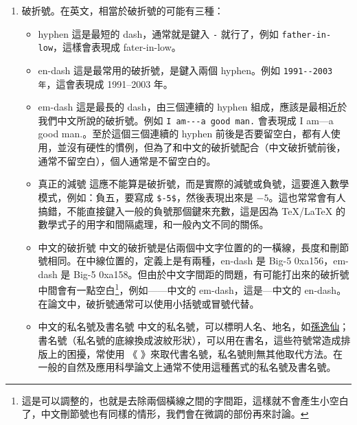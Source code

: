 \begin{enumerate}
   \item 破折號。在英文，相當於破折號的可能有三種：
         \begin{itemize}
            \item hyphen \newline
                  這是最短的 dash，通常就是鍵入 \verb|-| 就行了，例如 \verb|father-in-low|，這樣會表現成 fater-in-low。

            \item en-dash \newline
                  這是最常用的破折號，是鍵入兩個 hyphen。例如 \verb|1991--2003 年|，這會表現成 1991--2003 年。

            \item em-dash \newline
                  這是最長的 dash，由三個連續的 hyphen 組成，應該是最相近於我們中文所說的破折號。例如 \verb|I am---a good man.| 會表現成 I am---a good man.。至於這個三個連續的 hyphen 前後是否要留空白，都有人使用，並沒有硬性的慣例，但為了和中文的破折號配合（中文破折號前後，通常不留空白），個人通常是不留空白的。

            \item 真正的減號 \newline
                  這應不能算是破折號，而是實際的減號或負號，這要進入數學模式，例如：負五，要寫成 \verb|$-5$|，然後表現出來是 $-5$。這也常常會有人搞錯，不能直接鍵入一般的負號那個鍵來充數，這是因為 \TeX{}/\LaTeX{} 的數學式子的用字和間隔處理，和一般內文不同的關係。

            \item 中文的破折號 \newline
                  中文的破折號是佔兩個中文字位置的的一橫線，長度和刪節號相同。在中線位置的，定義上是有兩種，en-dash 是 {\ttfamily Big-5 0xa156}，em-dash 是 {\ttfamily Big-5 0xa158}。但由於中文字間距的問題，有可能打出來的破折號中間會有一點空白\footnote{這是可以調整的，也就是去除兩個橫線之間的字間距，這樣就不會產生小空白了，中文刪節號也有同樣的情形，我們會在微調的部份再來討論。}，例如——中文的 em-dash，這是––中文的 en-dash。在論文中，破折號通常可以使用小括號或冒號代替。

            \item 中文的私名號及書名號 \newline
                  中文的私名號，可以標明人名、地名，如\underline{孫逸仙}；書名號（私名號的底線換成波紋形狀），可以用在書名，這些符號常造成排版上的困擾，常使用 《 》來取代書名號，私名號則無其他取代方法。在一般的自然及應用科學論文上通常不使用這種舊式的私名號及書名號。
         \end{itemize}


\end{enumerate}
